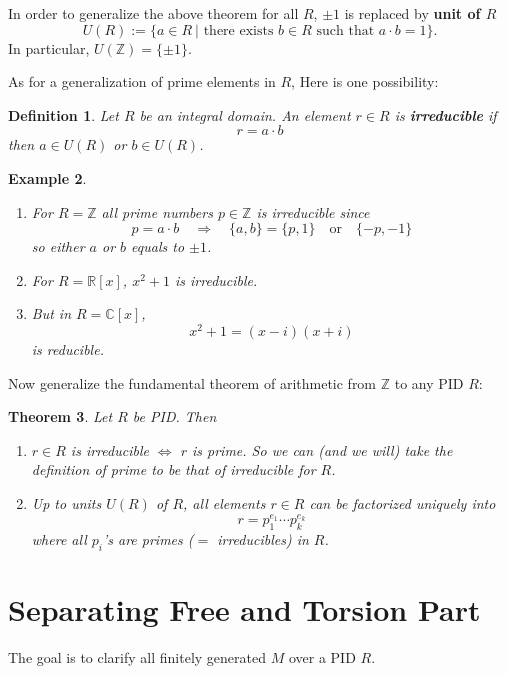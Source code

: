 \documentclass[12pt]{amsbook}
\newtheorem{theorem}{Theorem}[section]
\newtheorem{definition}[theorem]{Definition}
\newtheorem{example}[theorem]{Example}
\begin{document}
In order to generalize the above theorem for all $R$, $\pm 1$ is replaced by {\bf unit of $R$}
$$U(R):=\{a\in R\ |\text{ there exists }b\in R\text{ such that }a\cdot b=1\}.$$
In particular, $U(\mathbb{Z}) = \{\pm 1\}$. 

As for a generalization of prime elements in $R$, Here is one possibility:

\begin{definition}
    Let $R$ be an integral domain. An element $r\in R$ is {\bf irreducible} if
    $$r=a\cdot b$$
    then $a\in U(R)$ or $b\in U(R)$.
\end{definition}

\begin{example}\
    \begin{enumerate}
        \item For $R=\mathbb{Z}$ all prime numbers $p\in\mathbb{Z}$ is irreducible since
        $$p=a\cdot b\quad\Rightarrow\quad\{a,b\}=
            \{p,1\} \quad \text{or}\quad
            \{-p,-1\}$$
        so either $a$ or $b$ equals to $\pm1$.
        \item For $R=\mathbb{R}[x]$, $x^2+1$ is irreducible.\\
        \item But in $R=\mathbb{C}[x]$, 
        $$x^2+1=(x-i)(x+i)$$ is reducible.
    \end{enumerate}
\end{example}

Now generalize the fundamental theorem of arithmetic from $\mathbb{Z}$ to any PID $R$:

\begin{theorem}
    Let $R$ be PID. Then
    \begin{enumerate}
        \item $r\in R$ is irreducible $\Leftrightarrow$ $r$ is prime. So we can (and we will) take the definition of prime to be that of irreducible for $R$.
        \item Up to units $U(R)$ of $R$, all elements $r\in R$ can be factorized uniquely into 
        $$r=p_1^{e_1}\cdots p_k^{e_k}$$
        where all $p_i$'s are primes ($=$ irreducibles) in $R$.
    \end{enumerate}
\end{theorem}

\section{Separating Free and Torsion Part}
The goal is to clarify all finitely generated $M$ over a PID $R$.
\end{document}
